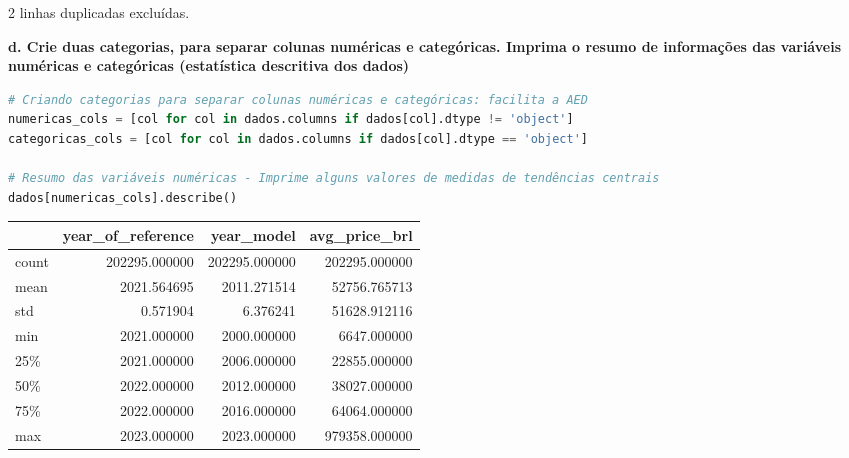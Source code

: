 2 linhas duplicadas excluídas.

\begin{adjustwidth}{1em}{}
\textbf{d. Crie duas categorias, para separar colunas numéricas e categóricas. Imprima o resumo de informações das variáveis numéricas e categóricas (estatística descritiva dos dados)}
\end{adjustwidth}

\begin{lstlisting}[language=Python, style=input]
# Criando categorias para separar colunas numéricas e categóricas: facilita a AED
numericas_cols = [col for col in dados.columns if dados[col].dtype != 'object']
categoricas_cols = [col for col in dados.columns if dados[col].dtype == 'object']

# Resumo das variáveis numéricas - Imprime alguns valores de medidas de tendências centrais 
dados[numericas_cols].describe()
\end{lstlisting}
\begin{table}[H]
\centering
\begin{tcolorbox}[myoutputstyle]
\begin{tabular}{lrrr}
\hline
 & \textbf{year\_of\_reference} & \textbf{year\_model} & \textbf{avg\_price\_brl} \\
\hline
count & 202295.000000 & 202295.000000 & 202295.000000 \\
mean & 2021.564695 & 2011.271514 & 52756.765713 \\
std  & 0.571904 & 6.376241 & 51628.912116 \\
min  & 2021.000000 & 2000.000000 & 6647.000000 \\
25\% & 2021.000000 & 2006.000000 & 22855.000000 \\
50\% & 2022.000000 & 2012.000000 & 38027.000000 \\
75\% & 2022.000000 & 2016.000000 & 64064.000000 \\
max  & 2023.000000 & 2023.000000 & 979358.000000 \\
\hline
\end{tabular}
\end{tcolorbox}
\end{table}

